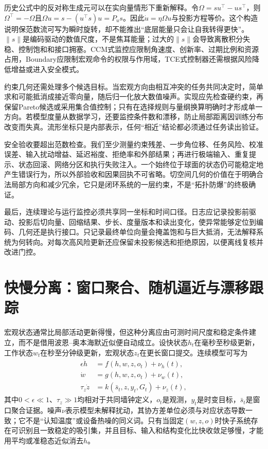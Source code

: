 历史公式中的反对称生成元可以在实向量情形下重新解释。令$\Omega=s u^\top-u s^\top$，则$\Omega^\top=-\Omega$且$\Omega u=s-(u^\top s)u=P_us$。因此$\dot u=\eta\Omega u$与投影方程等价。这个构造说明保范数流可写为瞬时旋转，却不能推出“底层能量只会让自我转得更快”。$\|s\|$是编码驱动的数值尺度，不是焦耳能量；过大的$\|s\|$会导致离散积分失稳、控制饱和和接口拥塞。CCM式监控应限制角速度、创新率、过期比例和资源占用，Boundary应限制宏观命令的权限与作用域，TCE式控制器还需根据风险降低增益或进入安全模式。

约束几何还需处理多个候选目标。当宏观方向由相互冲突的任务共同决定时，简单求和可能抵消成接近零向量，随后归一化放大数值噪声。实现应先检查硬约束，再保留Pareto候选或采用集合值控制；只有在选择规则与量纲换算明确时才形成单一方向。若模型度量从数据学习，还要监控条件数和漂移，防止局部距离因训练分布改变而失真。流形坐标只是内部表示，任何“相近”结论都必须通过任务读出验证。

安全验收要超出范数检查。我们至少测量约束残差、一步角位移、任务风险、校准误差、输入扰动增益、延迟裕度、拒绝率和外部结果；再进行极端输入、重复提示、状态回滚、网络分区和执行失败注入。一个始终位于球面的状态仍可能稳定地产生错误行为，所以外部验收和因果回执不可省略。切空间几何的价值在于明确合法局部方向和减少冗余，它只是闭环系统的一层约束，不是“拓扑防爆”的终极确证。

最后，连续理论与运行监控必须共享同一坐标和时间口径。日志应记录投影前驱动、投影后切向量、回缩结果、步长、度量版本和读出变化，使异常能够定位到编码、几何还是执行接口。只记录最终单位向量会掩盖饱和与巨大抵消，无法解释系统为何转向。对每次高风险更新还应保留未投影候选和拒绝原因，以便离线复核并改进门控。

\section{快慢分离：窗口聚合、随机逼近与漂移跟踪}
\label{sec:macro_adiabatic_separation}

宏观状态通常比局部活动更新得慢，但这种分离应由可测时间尺度和稳定条件建立，而不是借用波恩--奥本海默近似便自动成立。设快状态$h_t$在毫秒至秒级更新，工作状态$w_t$在秒至分钟级更新，宏观状态$z_t$在更长窗口提交。连续模型可写为
\begin{align}
 \epsilon\dot h &= f(h,w,z,o_t)+\nu_h(t),\\
 \dot w &= g(h,w,z,o_t)+\nu_w(t),\\
 \tau_z\dot z &= k(\bar s_t,z,y_t,G_t)+\nu_z(t),
\end{align}
其中$0<\epsilon\ll1$、$\tau_z\gg1$均相对于共同墙钟定义，$o_t$是观测，$y_t$是时变目标，$\bar s_t$是窗口聚合证据。噪声$\nu$表示模型未解释扰动，其协方差单位必须与对应状态导数一致；它不是“认知温度”或设备热噪的同义词。只有当固定$(w,z,o)$时快子系统存在可识别且一致稳定的吸引集，并且目标、输入和结构变化比快收敛足够慢，才能用平均或准稳态近似消去$h$。

